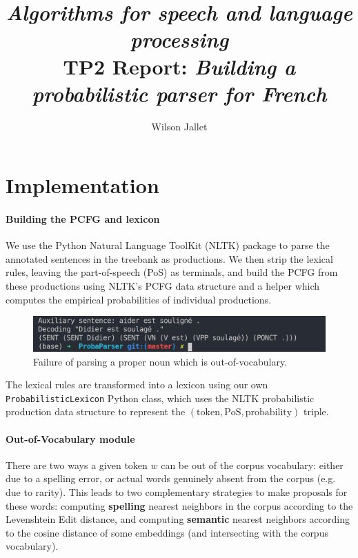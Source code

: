 \documentclass[11pt]{article}
\title{\textit{Algorithms for speech and language processing}\\
{\sffamily TP2 Report: \textit{Building a probabilistic parser for French}}}
\author{Wilson Jallet}
\begin{document}
\maketitle

\section{Implementation}

\paragraph{Building the PCFG and lexicon}

We use the Python Natural Language ToolKit (NLTK) \cite{nltkCitation} package to parse the annotated sentences in the treebank as productions. We then strip the lexical rules, leaving the part-of-speech (PoS) as terminals, and build the PCFG from these productions using NLTK's PCFG data structure and a helper which computes the empirical probabilities of individual productions.
\begin{figure}
	\centering
	\includegraphics[width=0.7\linewidth]{didiersoulage_screenshot}
	\caption{Failure of parsing a proper noun which is out-of-vocabulary.}
	\label{fig:npParseFailure_didiersoulage}
\end{figure}


The lexical rules are transformed into a lexicon using our own \lstinline|ProbabilisticLexicon| Python class, which uses the NLTK probabilistic production data structure to represent the $(\mathrm{token}, \mathrm{PoS}, \mathrm{probability})$ triple.



\paragraph{Out-of-Vocabulary module}

There are two ways a given token $w$ can be out of the corpus vocabulary: either due to a spelling error, or actual words genuinely absent from the corpus (e.g. due to rarity).
This leads to two complementary strategies to make proposals for these words: computing \textbf{spelling} nearest neighbors in the corpus according to the Levenshtein Edit distance, and computing \textbf{semantic} nearest neighbors according to the cosine distance of some embeddings (and intersecting with the corpus vocabulary).
\end{document}
